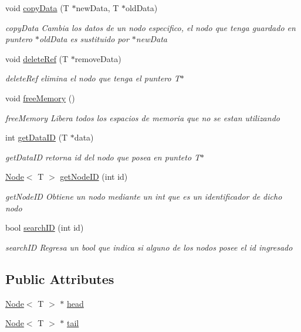 \begin{DoxyCompactItemize}
void \hyperlink{class_linked_list_a97f549fc2d43b889127273012fbfe7fa}{copy\+Data} (T $\ast$new\+Data, T $\ast$old\+Data)
\begin{DoxyCompactList}\small\item\em copy\+Data Cambia los datos de un nodo especifico, el nodo que tenga guardado en puntero $\ast$old\+Data es sustituido por $\ast$new\+Data \end{DoxyCompactList}\item 
void \hyperlink{class_linked_list_aa533ed600752a31abb17b0482e7c10c9}{delete\+Ref} (T $\ast$remove\+Data)
\begin{DoxyCompactList}\small\item\em delete\+Ref elimina el nodo que tenga el puntero T$\ast$ \end{DoxyCompactList}\item 
void \hyperlink{class_linked_list_a20857deefa26cdb553b7a5d8b706d84c}{free\+Memory} ()
\begin{DoxyCompactList}\small\item\em free\+Memory Libera todos los espacios de memoria que no se estan utilizando \end{DoxyCompactList}\item 
int \hyperlink{class_linked_list_a4e8d22209f9025284799c0212227e8a2}{get\+Data\+ID} (T $\ast$data)
\begin{DoxyCompactList}\small\item\em get\+Data\+ID retorna id del nodo que posea en punteto T$\ast$ \end{DoxyCompactList}\item 
\hyperlink{class_node}{Node}$<$ T $>$ \hyperlink{class_linked_list_aaf96dde647086d4370cd0b75024c1603}{get\+Node\+ID} (int id)
\begin{DoxyCompactList}\small\item\em get\+Node\+ID Obtiene un nodo mediante un int que es un identificador de dicho nodo \end{DoxyCompactList}\item 
bool \hyperlink{class_linked_list_ab607f61fa0222605f6f6dd794555e592}{search\+ID} (int id)
\begin{DoxyCompactList}\small\item\em search\+ID Regresa un bool que indica si alguno de los nodos posee el id ingresado \end{DoxyCompactList}\end{DoxyCompactItemize}
\subsection*{Public Attributes}
\begin{DoxyCompactItemize}
\item 
\hyperlink{class_node}{Node}$<$ T $>$ $\ast$ \hyperlink{class_linked_list_a35e09287e2d2943707b011208e7a8ed2}{head}
\item 
\hyperlink{class_node}{Node}$<$ T $>$ $\ast$ \hyperlink{class_linked_list_a428d620b6c645b408e0d6afd30335f63}{tail}
\end{DoxyCompactItemize}


